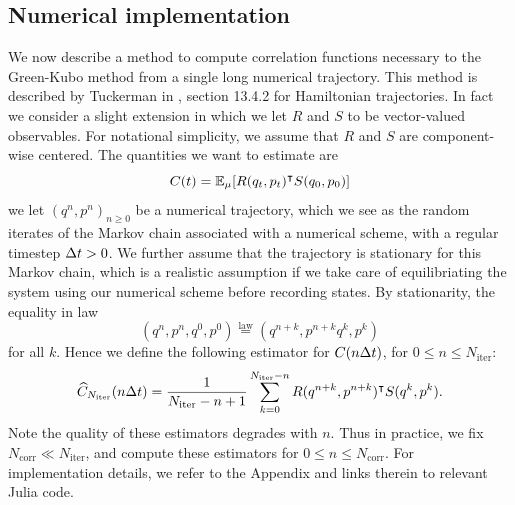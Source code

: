 \subsection{Numerical implementation}
We now describe a method to compute correlation functions necessary to the Green-Kubo method from a single long numerical trajectory.
This method is described by Tuckerman in \cite{T10}, section 13.4.2 for Hamiltonian trajectories.
In fact we consider a slight extension in which we let $R$ and $S$ to be vector-valued observables.
For notational simplicity, we assume that $R$ and $S$ are component-wise centered. The quantities we want to estimate are 
\begin{equation}
    \label{eq:time_correlation}
    C(t)=\mathbb{E}_\mu[R(q_t,p_t)^\intercal S(q_0,p_0)]
\end{equation}
we let $(q^n,p^n)_{n\geq 0}$ be a numerical trajectory, which we see as the random iterates of the Markov chain associated with a numerical scheme, with a regular timestep ${\Delta t}>0$.
We further assume that the trajectory is stationary for this Markov chain, which is a realistic assumption if we take care of equilibriating the system using our numerical scheme before recording states.
By stationarity, the equality in law
\[(q^n,p^n,q^0,p^0) \overset{\mathrm{law}}{=}(q^{n+k},p^{n+k}q^k,p^k)\]
for all $k$. Hence we define the following estimator for $C(n{\Delta t})$, for $0\leq n\leq N_{\mathrm{iter}}:$
\begin{equation}
    \label{eq:ac_estimator}
    \widehat{C}_{N_{\mathrm{iter}}}(n{\Delta t}) = \frac{1}{N_{\mathrm{iter}}-n+1}\sum_{k=0}^{N_{\mathrm{iter}}-n}R(q^{n+k},p^{n+k})^\intercal S(q^k,p^k).
\end{equation}
Note the quality of these estimators degrades with $n$. Thus in practice, we fix $N_{\mathrm{corr}}\ll N_{\mathrm{iter}}$, and compute these estimators for $0\leq n \leq N_{\mathrm{corr}}$.
For implementation details, we refer to the Appendix and links therein to relevant Julia code.

